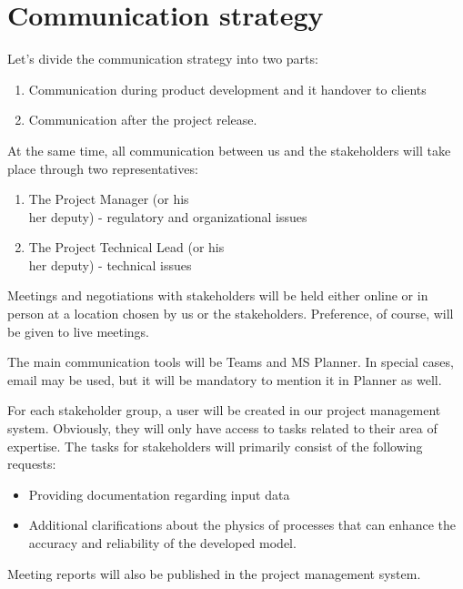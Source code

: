 \section{Communication strategy}\label{sec:communication-strategy}

Let's divide the communication strategy into two parts:

\begin{enumerate}
\item Communication during product development and it handover to clients


\item Communication after the project release.


\end{enumerate}
At the same time, all communication between us and the stakeholders will take place through two representatives:

\begin{enumerate}
\item The Project Manager (or his\\her deputy) - regulatory and organizational issues


\item The Project Technical Lead (or his\\her deputy) - technical issues


\end{enumerate}
Meetings and negotiations with stakeholders will be held either online or in person at a location chosen by us or the stakeholders.
Preference, of course, will be given to live meetings.

The main communication tools will be Teams and MS Planner.
In special cases, email may be used, but it will be mandatory to mention it in Planner as well.

For each stakeholder group, a user will be created in our project management system.
Obviously, they will only have access to tasks related to their area of expertise.
The tasks for stakeholders will primarily consist of the following requests:

\begin{itemize}
\item Providing documentation regarding input data


\item Additional clarifications about the physics of processes that can enhance the accuracy and reliability of the developed model.


\end{itemize}
Meeting reports will also be published in the project management system.


